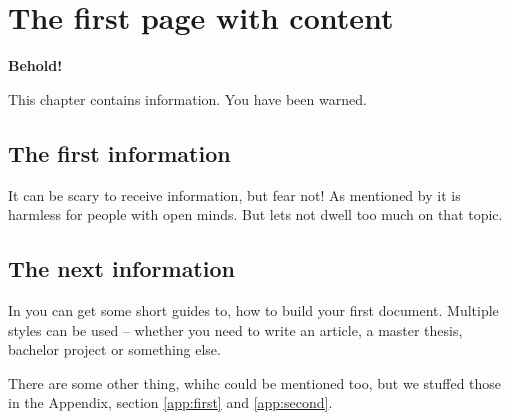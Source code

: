 
\chapter{The first page with content}

\textbf{Behold!}

This chapter contains information.
You have been warned.


\section{The first information}

It can be scary to receive information, but fear not!
As mentioned by \cite{dummy2015} it is harmless for people with open minds.
But lets not dwell too much on that topic. 



\section{The next information}

In \citep{LatexModulesLink} you can get some short guides to, how to build your first document.
Multiple styles can be used -- whether you need to write an article, a master thesis, bachelor project or something else.

There are some other thing, whihc could be mentioned too, but we stuffed those in the Appendix, section \ref{app:first} and \ref{app:second}.